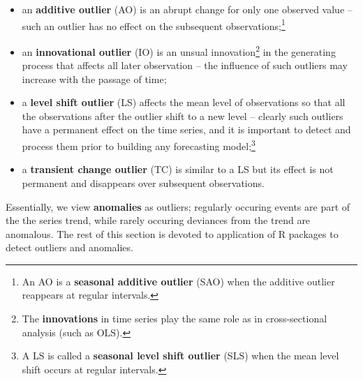 \begin{itemize}[noitemsep]\item an  \textbf{additive outlier} (AO) is an abrupt change for only one observed value -- such an outlier has no effect on the subsequent observations;\footnote{An AO is a  \textbf{seasonal additive outlier} (SAO) when the additive outlier reappears at regular intervals.}
\item an \textbf{innovational outlier} (IO) is an unsual innovation\footnote{The \textbf{innovations} in time series play the same role as  in cross-sectional analysis (such as OLS).} in the generating process that affects all later observation -- the influence of such outliers may increase with the passage of time;
\item a \textbf{level shift outlier} (LS) affects the mean level of observations so that all the observations after the outlier shift to a new level -- clearly such outliers have a permanent effect on the time series, and it is important to detect and process them prior to building any forecasting model;\footnote{A LS is called a \textbf{seasonal level shift outlier}  (SLS) when the mean level shift occurs at regular intervals.}
\item a \textbf{transient change outlier}  (TC) is similar to a LS but its effect is not permanent and disappears over subsequent observations.
\end{itemize}
Essentially, we view \textbf{anomalies} as outliers; regularly occuring events are part of the the series trend, while rarely occuring deviances from the trend are anomalous.
\newl The rest of this section is devoted to application of R packages to detect outliers and anomalies. 
